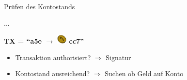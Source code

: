 \documentclass[aspectratio=169]{beamer}
\begin{document}
\begin{frame}{Prüfen des Kontostands}
\begin{center}
{            ...
        }
    \end{center}
    \vspace{0.75cm}
    \textbf{TX = ``\textcolor{myviolet}{\textbf{a5e}} $\rightarrow$ \includegraphics[width=0.5cm]{../icons/Coin} cc7''}
    \begin{itemize}
        \item Transaktion authorisiert? $\Rightarrow$ Signatur \textcolor{mydarkgreen}{\Large\checkmark}
        \item Kontostand ausreichend? $\Rightarrow$ Suchen ob Geld auf Konto \textcolor{mydarkgreen}{\Large\checkmark}
    \end{itemize}
\end{frame}
\end{document}
